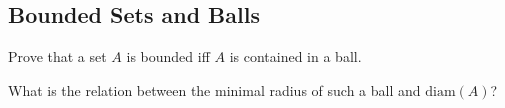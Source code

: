 \subsection{Bounded Sets and Balls}

\begin{majorEx}
    Prove that a set $A$ is bounded iff $A$ is contained in a ball.
\end{majorEx}

\begin{minorEx}
    What is the relation between the minimal radius of such a ball and
    $\mathrm{diam}(A)$?
\end{minorEx}
